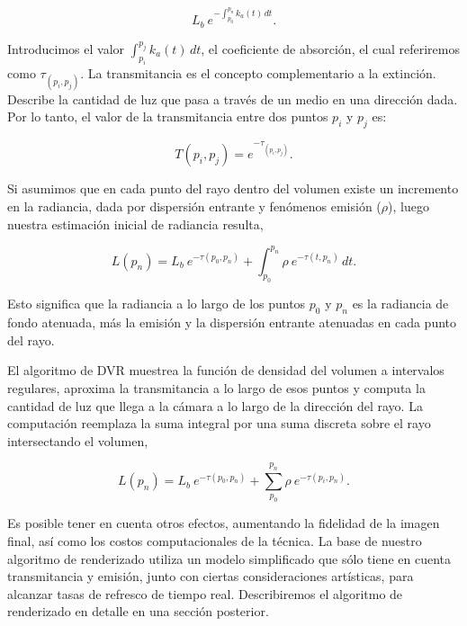 \begin{equation} \label{eq:radiance_absorption}  
    L_b \ e^{- \textstyle  \int_{p_0}^{p_n} k_a(t) \, dt}.
\end{equation}

Introducimos el valor $\int_{p_i}^{p_j} k_a(t) \, dt$, el coeficiente de absorción, el cual referiremos como $\tau_{(p_i, p_j)}$. 
La transmitancia es el concepto complementario a la extinción. Describe la cantidad de luz que pasa a través de un medio en una dirección dada.
Por lo tanto, el valor de la transmitancia entre dos puntos $p_i$ y $p_j$ es:

\begin{equation} \label{eq:transmittance}  
  T(p_i,p_j) = e^{- \textstyle \tau_{(p_i, p_j)}}.
\end{equation}

Si asumimos que en cada punto del rayo dentro del volumen existe un incremento en la radiancia, dada por dispersión entrante y fenómenos emisión ($\rho$), luego nuestra estimación inicial de radiancia resulta,

\begin{equation} \label{eq:ray_radiance}  
  L(p_n) = L_b \ e^{-\tau(p_0, p_n)} + \int_{p_0}^{p_n} \rho \ e^{-\tau(t,p_n)} \, dt.
\end{equation}

Esto significa que la radiancia a lo largo de los puntos $p_0$ y $p_n$ es la radiancia de fondo atenuada, más la emisión y la dispersión entrante atenuadas en cada punto del rayo.

El algoritmo de DVR muestrea la función de densidad del volumen a intervalos regulares, aproxima la transmitancia a lo largo de esos puntos y computa la cantidad de luz que llega a la cámara a lo largo de la dirección del rayo.
La computación reemplaza la suma integral por una suma discreta sobre el rayo intersectando el volumen,

\begin{equation} \label{eq:ray_radiance}  
  L(p_n) = L_b \ e^{-\tau(p_0, p_n)} + \sum_{p_0}^{p_n} \rho \ e^{-\tau(p_i,p_n)}.
\end{equation}

Es posible tener en cuenta otros efectos, aumentando la fidelidad de la imagen final, así como los costos computacionales de la técnica.
La base de nuestro algoritmo de renderizado utiliza un modelo simplificado que sólo tiene en cuenta transmitancia y emisión, junto con ciertas consideraciones artísticas, para alcanzar tasas de refresco de tiempo real.
Describiremos el algoritmo de renderizado en detalle en una sección posterior.


